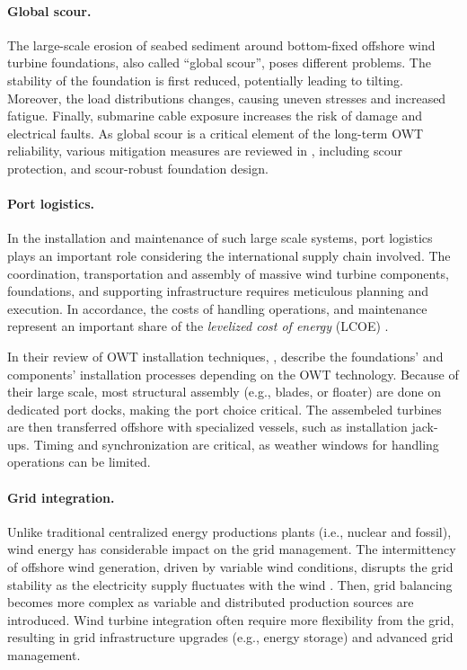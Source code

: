 \paragraph{Global scour.}
The large-scale erosion of seabed sediment around bottom-fixed offshore wind turbine foundations, also called ``global scour'', poses different problems. 
The stability of the foundation is first reduced, potentially leading to tilting. 
Moreover, the load distributions changes, causing uneven stresses and increased fatigue. 
Finally, submarine cable exposure increases the risk of damage and electrical faults. 
As global scour is a critical element of the long-term OWT reliability, various mitigation measures are reviewed in \citet{fazeres_2021_scour}, including scour protection, and scour-robust foundation design.


\paragraph{Port logistics.}
In the installation and maintenance of such large scale systems, port logistics plays an important role considering the international supply chain involved. 
The coordination, transportation and assembly of massive wind turbine components, foundations, and supporting infrastructure requires meticulous planning and execution. 
In accordance, the costs of handling operations, and maintenance represent an important share of the \textit{levelized cost of energy} (LCOE) \citep{shields_2021_owt_lcoe}.  

In their review of OWT installation techniques, \citet{jiang_2021_owt_installation_review}, describe the foundations' and components' installation processes depending on the OWT technology. 
Because of their large scale, most structural assembly (e.g., blades, or floater) are done on dedicated port docks, making the port choice critical.  
The assembeled turbines are then transferred offshore with specialized vessels, such as installation jack-ups. 
Timing and synchronization are critical, as weather windows for handling operations can be limited.


\paragraph{Grid integration.}
Unlike traditional centralized energy productions plants (i.e., nuclear and fossil), wind energy has considerable impact on the grid management. 
The intermittency of offshore wind generation, driven by variable wind conditions, disrupts the grid stability as the electricity supply fluctuates with the wind \citep{heier_2014_grid_integration}. 
Then, grid balancing becomes more complex as variable and distributed production sources are introduced.  
Wind turbine integration often require more flexibility from the grid, resulting in grid infrastructure upgrades (e.g., energy storage) and advanced grid management. 





